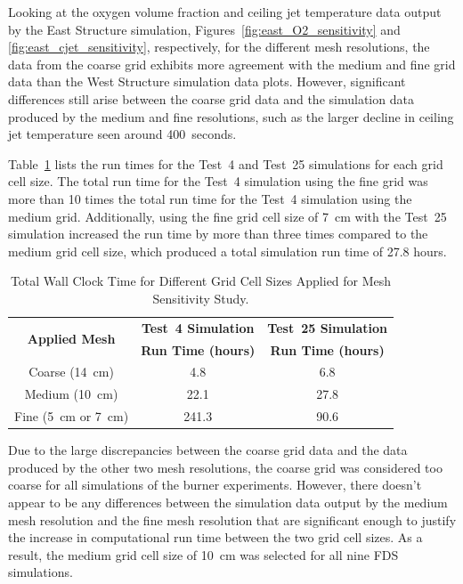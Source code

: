 Looking at the oxygen volume fraction and ceiling jet temperature data output by the East Structure simulation, Figures~\ref{fig:east_O2_sensitivity} and \ref{fig:east_cjet_sensitivity}, respectively, for the different mesh resolutions, the data from the coarse grid exhibits more agreement with the medium and fine grid data than the West Structure simulation data plots. However, significant differences still arise between the coarse grid data and the simulation data produced by the medium and fine resolutions, such as the larger decline in ceiling jet temperature seen around 400~seconds. 

Table~\ref{table:sensitivity_times} lists the run times for the Test~4 and Test~25 simulations for each grid cell size. The total run time for the Test~4 simulation using the fine grid was more than 10 times the total run time for the Test~4 simulation using the medium grid. Additionally, using the fine grid cell size of 7~cm with the Test~25 simulation increased the run time by more than three times compared to the medium grid cell size, which produced a total simulation run time of 27.8 hours.  
\begin{table}[!ht]
\caption{Total Wall Clock Time for Different Grid Cell Sizes Applied for Mesh Sensitivity Study.}
\begin{center}
\begin{tabular}{ccc}
\toprule
\multirow{2}{*}{\textbf{Applied Mesh}}  &  \textbf{Test~4 Simulation}   &  \textbf{Test~25 Simulation}   \\
                                        &  \textbf{Run Time (hours)}    &  \textbf{Run Time (hours)}     \\
\midrule
Coarse (14~cm)                          &   4.8                         &   6.8       \\
Medium (10~cm)                          &   22.1                        &   27.8      \\
Fine (5~cm or 7~cm)                     &   241.3                       &   90.6      \\
\bottomrule
\end{tabular}
\end{center}
\label{table:sensitivity_times}
\end{table}
\FloatBarrier
Due to the large discrepancies between the coarse grid data and the data produced by the other two mesh resolutions, the coarse grid was considered too coarse for all simulations of the burner experiments. However, there doesn't appear to be any differences between the simulation data output by the medium mesh resolution and the fine mesh resolution that are significant enough to justify the increase in computational run time between the two grid cell sizes. As a result, the medium grid cell size of 10~cm was selected for all nine FDS simulations.

